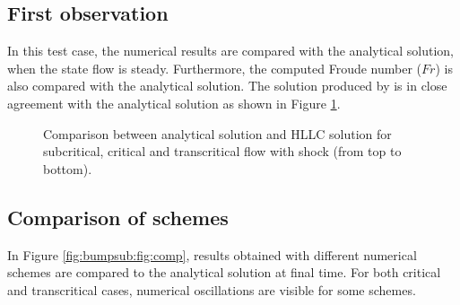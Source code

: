 \subsection{First observation}

In this test case, the numerical results are compared with the
analytical solution, when the state flow is steady. Furthermore, the computed
Froude number ($Fr$) is also
compared with the analytical solution.
The solution produced by  is in close agreement with
the analytical solution as shown in
Figure \ref{fig:bumpsub:fig:hfr}.


\begin{figure}[H]
\begin{minipage}[t]{0.5\textwidth}
 \centering
\end{minipage}%
\begin{minipage}[t]{0.5\textwidth}
 \centering
\end{minipage}
\begin{minipage}[t]{0.5\textwidth}
 \centering
\end{minipage}%
\begin{minipage}[t]{0.5\textwidth}
 \centering
\end{minipage}
\begin{minipage}[t]{0.5\textwidth}
 \centering
\end{minipage}%
\begin{minipage}[t]{0.5\textwidth}
 \centering
\end{minipage}
 \caption{Comparison between analytical solution and  HLLC
 solution for subcritical, critical and transcritical flow with shock (from top to bottom).}\label{fig:bumpsub:fig:hfr}
\end{figure}


\subsection{Comparison of schemes}
In Figure \ref{fig:bumpsub:fig:comp}, results obtained with different numerical schemes are compared to the analytical solution at final time. For both critical and transcritical cases, numerical oscillations are visible for some schemes.

